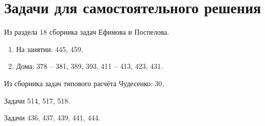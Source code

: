 \section*{Задачи для самостоятельного решения}

Из раздела 18 сборника задач Ефимова и Поспелова.
\begin{enumerate}
    \item На занятии: 445, 459.
    \item Дома: 378 -- 381, 389, 393, 411 -- 413, 423, 431.
\end{enumerate}

Из сборника задач типового расчёта Чудесенко: 30.

Задачи 514, 517, 518.

Задачи 436, 437, 439, 441, 444.
